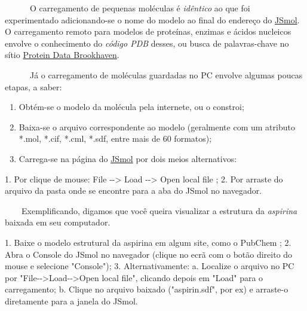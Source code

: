 \documentclass[
  letterpaper,
  DIV=11,
  numbers=noendperiod]{scrreprt}
\newenvironment{Shaded}{\begin{snugshade}}{\end{snugshade}}
\newcommand{\FloatTok}[1]{\textcolor[rgb]{0.68,0.00,0.00}{#1}}
\newcommand{\FunctionTok}[1]{\textcolor[rgb]{0.28,0.35,0.67}{#1}}
\newcommand{\NormalTok}[1]{\textcolor[rgb]{0.00,0.23,0.31}{#1}}
\newcommand{\OtherTok}[1]{\textcolor[rgb]{0.00,0.23,0.31}{#1}}
\newcommand{\SpecialCharTok}[1]{\textcolor[rgb]{0.37,0.37,0.37}{#1}}
\newcommand{\StringTok}[1]{\textcolor[rgb]{0.13,0.47,0.30}{#1}}
\providecommand{\tightlist}{%
  \setlength{\itemsep}{0pt}\setlength{\parskip}{0pt}}\usepackage{longtable,booktabs,array}
\begin{document}
~~~~~~O carregamento de pequenas moléculas é \emph{idêntico} ao que foi
experimentado adicionando-se o nome do modelo ao final do endereço do
\href{https://chemapps.stolaf.edu/jmol/jmol.php?model=water}{JSmol}. O
carregamento remoto para modelos de proteínas, enzimas e ácidos
nucleicos envolve o conhecimento do \emph{código PDB} desses, ou busca
de palavras-chave no sítio \href{https://www.rcsb.org}{Protein Data
Brookhaven}.

~~~~~~Já o carregamento de moléculas guardadas no PC envolve algumas
poucas etapas, a saber:

\begin{enumerate}
\def\labelenumi{\arabic{enumi}.}
\tightlist
\item
  Obtém-se o modelo da molécula pela internete, ou o constroi;
\item
  Baixa-se o arquivo correspondente ao modelo (geralmente com um
  atributo *.mol, *.cif, *.cml, *.sdf, entre mais de 60 formatos);
\item
  Carrega-se na página do
  \href{https://chemapps.stolaf.edu/jmol/jmol.php?model=water}{JSmol}
  por dois meios alternativos:
\end{enumerate}

\begin{Shaded}
\begin{Highlighting}[]
\FloatTok{1.}\NormalTok{ Por clique de mouse}\SpecialCharTok{:}\NormalTok{ File }\SpecialCharTok{{-}}\OtherTok{{-}\textgreater{}}\NormalTok{ Load }\SpecialCharTok{{-}}\OtherTok{{-}\textgreater{}}\NormalTok{ Open local file ;}
\FloatTok{2.}\NormalTok{ Por arraste do arquivo da pasta onde se encontre para a aba do JSmol no navegador.}
\end{Highlighting}
\end{Shaded}

~~~~Exemplificando, digamos que você queira visualizar a estrutura da
\emph{aspirina} baixada em seu computador.

\begin{Shaded}
\begin{Highlighting}[]
\FloatTok{1.}\NormalTok{ Baixe o modelo estrutural da aspirina em algum site, como o PubChem ;}
\FloatTok{2.}\NormalTok{ Abra o Console do JSmol no }\FunctionTok{navegador}\NormalTok{ (clique no ecrã com o botão direito do mouse e selecione }\StringTok{"Console"}\NormalTok{);}
\FloatTok{3.}\NormalTok{ Alternativamente}\SpecialCharTok{:}
\NormalTok{  a. Localize o arquivo no PC por }\StringTok{"File{-}{-}\textgreater{}Load{-}{-}\textgreater{}Open local file"}\NormalTok{, clicando depois em }\StringTok{"Load"}\NormalTok{ para o carregamento;}
\NormalTok{  b. Clique no arquivo }\FunctionTok{baixado}\NormalTok{ (}\StringTok{"aspirin.sdf"}\NormalTok{, por ex) e arraste}\SpecialCharTok{{-}}\NormalTok{o diretamente para a janela do JSmol. }
\end{Highlighting}
\end{Shaded}
\end{document}
